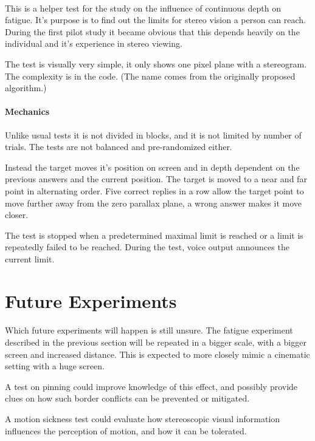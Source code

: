 \paragraph{}
This is a helper test for the study on the influence of continuous depth on fatigue.
It's purpose is to find out the limits for stereo vision a person can reach.
During the first pilot study it became obvious that this depends heavily on the individual and it's experience in stereo viewing.

The test is visually very simple, it only shows one pixel plane with a stereogram.
The complexity is in the code.
(The name comes from the originally proposed algorithm.)

\paragraph{Mechanics}
Unlike usual tests it is not divided in blocks, and it is not limited by number of trials.
The tests are not balanced and pre-randomized either.

Instead the target moves it's position on screen and in depth dependent on the previous answers and the current position.
The target is moved to a near and far point in alternating order.
Five correct replies in a row allow the target point to move further away from the zero parallax plane,
a wrong answer makes it move closer.

The test is stopped when a predetermined maximal limit is reached or a limit is repeatedly failed to be reached.
During the test, voice output announces the current limit.


\section{Future Experiments}
\paragraph{}
Which future experiments will happen is still unsure.
The fatigue experiment described in the previous section will be repeated in a bigger scale, with a bigger screen and increased distance.
This is expected to more closely mimic a cinematic setting with a huge screen.

A test on pinning could improve knowledge of this effect, and possibly provide clues on how such border conflicts can be prevented or mitigated.

A motion sickness test could evaluate how stereoscopic visual information influences the perception of motion, and how it can be tolerated.


